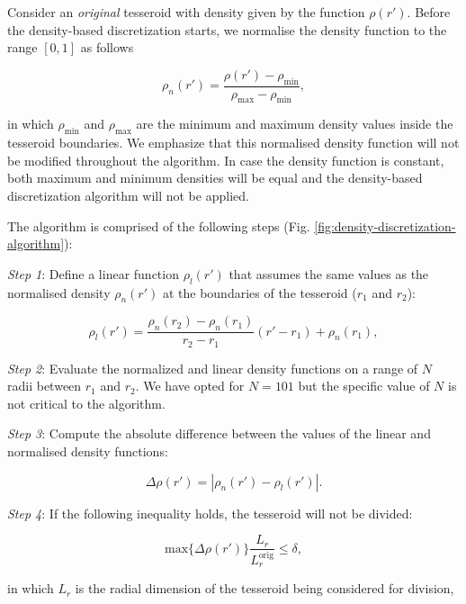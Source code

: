 \documentclass[extra, referee]{gji}
\begin{document}
Consider an \emph{original} tesseroid with density given by the function $\rho(r')$.
Before the density-based discretization starts,
we normalise the density function to the range $[0, 1]$ as follows

\begin{equation}
    \rho_n(r') =
    \frac{\rho(r') - \rho_\text{min}}{\rho_\text{max} - \rho_\text{min}},
\end{equation}

\noindent in which $\rho_\text{min}$ and $\rho_\text{max}$ are the minimum and maximum
density values inside the tesseroid boundaries.
We emphasize that this normalised density function will not be modified throughout the
algorithm.
In case the density function is constant, both maximum and minimum densities will be
equal and the density-based discretization algorithm will not be applied.

The algorithm is comprised of the following steps
(Fig. \ref{fig:density-discretization-algorithm}):

\textit{Step 1}:
Define a linear function $\rho_l(r')$ that assumes
the same values as the normalised density $\rho_n(r')$ at the boundaries of the
tesseroid ($r_1$ and $r_2$):

\begin{equation}
    \rho_l(r') =
    \frac{ \rho_n(r_2) - \rho_n(r_1) }{ r_2 - r_1 } (r' - r_1) + \rho_n(r_1),
    \label{eq:density-reference-line}
\end{equation}

\textit{Step 2}:
Evaluate the normalized and linear density functions on a range of $N$ radii between
$r_1$ and $r_2$.
We have opted for $N = 101$ but the specific value of $N$ is not critical to the
algorithm.

\textit{Step 3}:
Compute the absolute difference between the values of the linear and normalised density
functions:

\begin{equation}
    \Delta \rho (r') = | \rho_n(r') - \rho_l(r') |.
    \label{eq:density-abs-diff}
\end{equation}

\textit{Step 4}:
If the following inequality holds, the tesseroid will not be divided:

\begin{equation}
    \text{max}\{ \Delta \rho(r') \} \frac{L_r}{L_r^\text{orig}} \le \delta,
    \label{eq:delta-density}
\end{equation}

\noindent
in which $L_r$ is the radial dimension of the tesseroid being considered for division,
\end{document}

